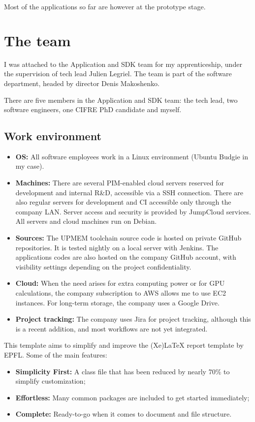 Most of the applications so far are however at the prototype stage.

\section{The team}
I was attached to the Application and SDK team for my apprenticeship, under the supervision of tech lead Julien Legriel. The team is part of the software department, headed by director Denis Makoshenko.

There are five members in the Application and SDK team: the tech lead, two software engineers, one CIFRE PhD candidate and myself.

\subsection{Work environment}
\begin{itemize}
    \item \textbf{OS:} All software employees work in a Linux environment (Ubuntu Budgie in my case).
    \item \textbf{Machines:} There are several PIM-enabled cloud servers reserved for development and internal R\&D, accessible via a SSH connection. There are also regular servers for development and CI accessible only through the company LAN. Server access and security is provided by JumpCloud services. All servers and cloud machines run on Debian.
    \item \textbf{Sources:} The UPMEM toolchain source code is hosted on private GitHub repositories. It is tested nightly on a local server with Jenkins. The applications codes are also hosted on the company GitHub account, with visibility settings depending on the project confidentiality.
    \item \textbf{Cloud:} When the need arises for extra computing power or for GPU calculations, the company subscription to AWS allows me to use EC2 instances. For long-term storage, the company uses a Google Drive.
    \item \textbf{Project tracking:} The company uses Jira for project tracking, although this is a recent addition, and most workflows are not yet integrated.
\end{itemize}

This template aims to simplify and improve the (Xe)LaTeX report template by EPFL. Some of the main features:

\begin{itemize}
  \item \textbf{Simplicity First:} A class file that has been reduced by nearly 70\% to simplify customization;
  \item \textbf{Effortless:} Many common packages are included to get started immediately;
  \item \textbf{Complete:} Ready-to-go when it comes to document and file structure.
\end{itemize}

